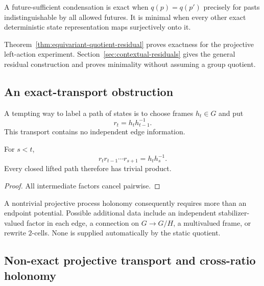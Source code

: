\begin{definition}
A future-sufficient condensation is exact when
$q(p)=q(p')$ precisely for pasts indistinguishable by all allowed futures.  It
is minimal when every other exact deterministic state representation maps
surjectively onto it.
\end{definition}

Theorem~\ref{thm:equivariant-quotient-residual} proves exactness for the
projective left-action experiment.  Section~\ref{sec:contextual-residuals}
gives the general residual construction and proves minimality without assuming
a group quotient.

\subsection{An exact-transport obstruction}

A tempting way to label a path of states is to choose frames $h_t\in G$ and
put
\[
  r_t=h_t h_{t-1}^{-1}.
\]
This transport contains no independent edge information.

\begin{proposition}
\label{prop:exact-transport-telescope}
For $s<t$,
\[
  r_t r_{t-1}\cdots r_{s+1}=h_t h_s^{-1}.
\]
Every closed lifted path therefore has trivial product.
\end{proposition}

\begin{proof}
All intermediate factors cancel pairwise.
\end{proof}

A nontrivial projective process holonomy consequently requires more than an
endpoint potential.  Possible additional data include an independent
stabilizer-valued factor in each edge, a connection on $G\to G/H$, a
multivalued frame, or rewrite $2$-cells.  None is supplied automatically by the
static quotient.


\subsection{Non-exact projective transport and cross-ratio holonomy}
\label{subsec:non-exact-projective-transport}

